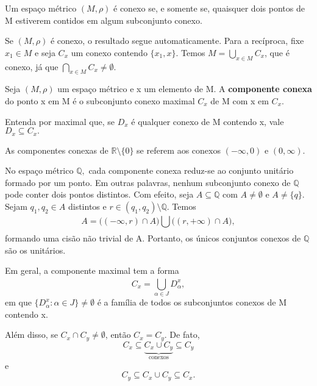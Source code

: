 \documentclass[metric_notes.tex]{subfiles}
\begin{document}
\begin{prop*}
	Um espaço métrico \((M, \rho )\) é conexo se, e somente se, quaisquer dois pontos de M estiverem contidos em algum subconjunto
	conexo.
\end{prop*}
\begin{proof*}
	Se \((M, \rho )\) é conexo, o resultado segue automaticamente. Para a recíproca, fixe \(x_{1}\in M\) e seja
	\(C_{x}\) um conexo contendo \(\{x_{1}, x\}\). Temos \(M = \bigcup_{x\in M}^{}{C_{x}}\), que é conexo, já que \(\bigcap_{x\in M}^{}{C_{x}}\neq\emptyset.\) \qedsymbol
\end{proof*}
\begin{def*}
	Seja \((M, \rho )\) um espaço métrico e x um elemento de M. A \textbf{componente conexa} do ponto x em M é o subconjunto conexo maximal
	\(C_{x}\) de M com x em \(C_{x}\).
\end{def*}
Entenda por maximal que, se \(D_{x}\) é qualquer conexo de M contendo x, vale \(D_{x}\subseteq{C_{x}}.\)
\begin{example}
	As componentes conexas de \(\mathbb{R}\setminus{\{0\}}\) se referem aos conexos \((-\infty, 0)\) e \((0, \infty).\)
\end{example}
\begin{example}
	No espaço métrico \(\mathbb{Q},\) cada componente conexa reduz-se ao conjunto unitário formado por um ponto. Em outras palavras,
	nenhum subconjunto conexo de \(\mathbb{Q}\) pode conter dois pontos distintos. Com efeito, seja \(A\subseteq{\mathbb{Q}}\) com \(A \neq\emptyset\)
	e \(A\neq\{q\}.\) Sejam \(q_{1}, q_{2}\in A\) distintos e \(r\in(q_{1}, q_{2})\setminus{\mathbb{Q}}\). Temos
	\[
		A = \biggl((-\infty, r)\cap A\biggr)\bigcup_{}^{}{\biggl((r, +\infty)\cap A\biggr)},
	\]
	formando uma cisão não trivial de A. Portanto, os únicos conjuntos conexos de \(\mathbb{Q}\) são os unitários.
\end{example}
Em geral, a componente maximal tem a forma
\[
	C_{x} = \bigcup_{\alpha \in J}^{}{D_{\alpha }^{x}},
\]
em que \(\{D_{\alpha }^{x}: \alpha \in J\}\neq\emptyset\) é a família de todos os subconjuntos conexos de M contendo x.

Além disso, se \(C_{x}\cap C_{y} \neq\emptyset\), então \(C_{x} = C_{y}.\) De fato,
\[
	C_{x} \subseteq\underbrace{{C_{x}\cup C_{y}}}_{\text{conexos}} \subseteq{C_{y}}
\]
e
\[
	C_{y}\subseteq{C_{x}\cup C_{y}}\subseteq{C_{x}}.
\]
\end{document}
